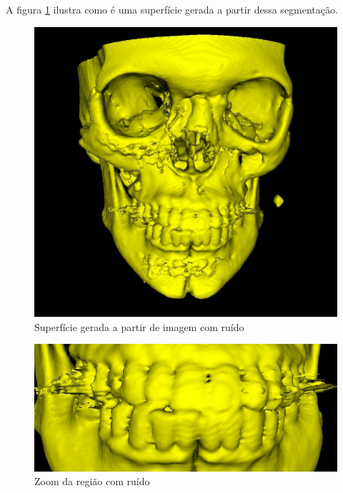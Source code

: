 A figura \ref{fig:surface_amagaman} ilustra como é uma superfície gerada a partir dessa
segmentação.

\begin{figure}[!htb]
\centering
\includegraphics[scale=0.3]{../user_guide_figures/invesalius_screen/segmentation_manual_noise_amalgam_3d.jpg}
\caption{Superfície gerada a partir de imagem com ruído}
\label{fig:surface_amagaman}
\end{figure}

\begin{figure}[!htb]
\centering
\includegraphics[scale=0.3]{../user_guide_figures/invesalius_screen/segmentation_manual_noise_amalgam_3d_zoom.jpg}
\caption{Zoom da região com ruído}
\label{fig:surface_amagaman_zoom}
\end{figure}

\newpage

